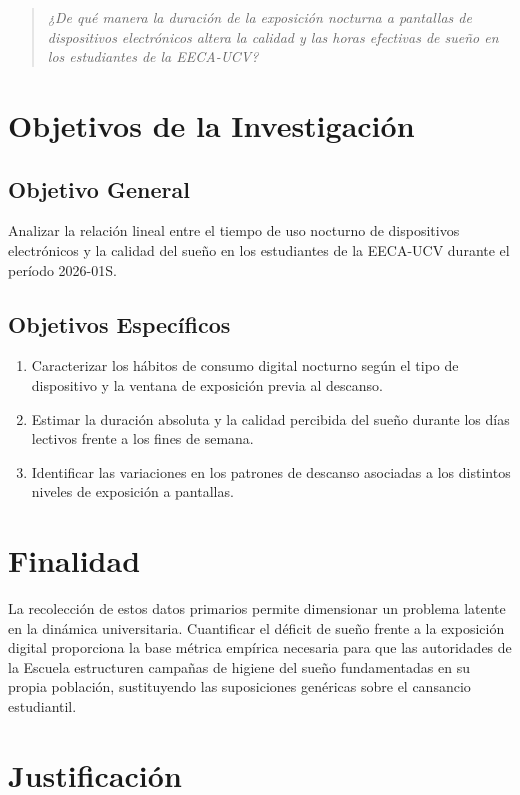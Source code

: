 \documentclass[12pt, letterpaper]{article}
\begin{document}
\begin{quote}
\textit{¿De qué manera la duración de la exposición nocturna a pantallas de dispositivos electrónicos altera la calidad y las horas efectivas de sueño en los estudiantes de la EECA-UCV?}
\end{quote}


\section{Objetivos de la Investigación}

\subsection{Objetivo General}
Analizar la relación lineal entre el tiempo de uso nocturno de dispositivos electrónicos y la calidad del sueño en los estudiantes de la EECA-UCV durante el período 2026-01S.

\subsection{Objetivos Específicos}
\begin{enumerate}
    \item Caracterizar los hábitos de consumo digital nocturno según el tipo de dispositivo y la ventana de exposición previa al descanso.
    \item Estimar la duración absoluta y la calidad percibida del sueño durante los días lectivos frente a los fines de semana.
    \item Identificar las variaciones en los patrones de descanso asociadas a los distintos niveles de exposición a pantallas.
\end{enumerate}


\section{Finalidad}

La recolección de estos datos primarios permite dimensionar un problema latente en la dinámica universitaria. Cuantificar el déficit de sueño frente a la exposición digital proporciona la base métrica empírica necesaria para que las autoridades de la Escuela estructuren campañas de higiene del sueño fundamentadas en su propia población, sustituyendo las suposiciones genéricas sobre el cansancio estudiantil.


\section{Justificación}
\end{document}
